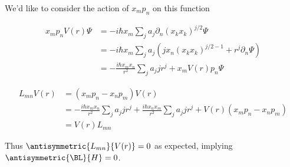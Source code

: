 We'd like to consider the action of $x_m p_n$ on this function

\begin{align*}
x_m p_n V(r) \Psi
&= -i \hbar x_m \sum_j a_j \partial_n (x_k x_k)^{j/2} \Psi \\
&= -i \hbar x_m \sum_j a_j (j x_n (x_k x_k)^{j/2-1} + r^j \partial_n \Psi) \\
&= -\frac{i \hbar x_m x_n}{r^2} \sum_j a_j j r^j + 
x_m V(r) p_n \Psi
\end{align*}

\begin{align*}
L_{mn} V(r) 
&=
(x_m p_n - x_n p_m) V(r) \\
&= 
-\frac{i \hbar x_m x_n}{r^2} \sum_j a_j j r^j
+\frac{i \hbar x_n x_m}{r^2} \sum_j a_j j r^j 
+ 
V(r) (x_m p_n - x_n p_m )
\\
&= 
V(r) L_{mn}
\end{align*}

Thus $\antisymmetric{L_{mn}}{V(r)} = 0$ as expected, implying $\antisymmetric{\BL}{H} = 0$.

\EndArticle
